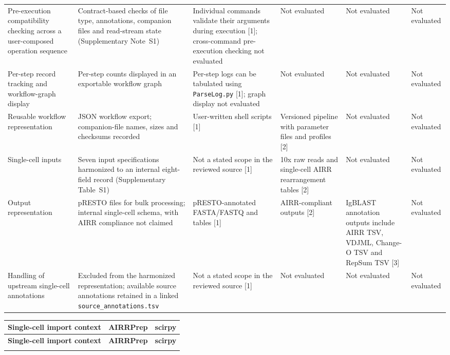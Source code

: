 \documentclass[11pt]{article}
\begin{document}
\begin{landscape}
\begin{longtable}{p{}p{}p{}p{}p{}p{}}
Pre-execution compatibility checking across a user-composed operation sequence &
Contract-based checks of file type, annotations, companion files and read-stream state (Supplementary Note~S1) &
Individual commands validate their arguments during execution [1]; cross-command pre-execution checking not evaluated &
Not evaluated &
Not evaluated &
Not evaluated \\

Per-step record tracking and workflow-graph display &
Per-step counts displayed in an exportable workflow graph &
Per-step logs can be tabulated using \texttt{ParseLog.py} [1]; graph display not evaluated &
Not evaluated &
Not evaluated &
Not evaluated \\

Reusable workflow representation &
JSON workflow export; companion-file names, sizes and checksums recorded &
User-written shell scripts [1] &
Versioned pipeline with parameter files and profiles [2] &
Not evaluated &
Not evaluated \\

Single-cell inputs &
Seven input specifications harmonized to an internal eight-field record (Supplementary Table~S1) &
Not a stated scope in the reviewed source [1] &
10x raw reads and single-cell AIRR rearrangement tables [2] &
Not evaluated &
Not evaluated \\

Output representation &
pRESTO files for bulk processing; internal single-cell schema, with AIRR compliance not claimed &
pRESTO-annotated FASTA/FASTQ and tables [1] &
AIRR-compliant outputs [2] &
IgBLAST annotation outputs include AIRR TSV, VDJML, Change-O TSV and RepSum TSV [3] &
Not evaluated \\

Handling of upstream single-cell annotations &
Excluded from the harmonized representation; available source annotations retained in a linked \texttt{source\_annotations.tsv} &
Not a stated scope in the reviewed source [1] &
Not evaluated &
Not evaluated &
Not evaluated \\

\end{longtable}

\begin{longtable}{p{}p{}p{}}
\toprule
\textbf{Single-cell import context} &
\textbf{AIRRPrep} &
\textbf{scirpy} \\
\midrule
\endfirsthead
\toprule
\textbf{Single-cell import context} &
\textbf{AIRRPrep} &
\textbf{scirpy} \\
\midrule
\endhead
\bottomrule
\endfoot


\end{longtable}
\end{landscape}
\end{document}
